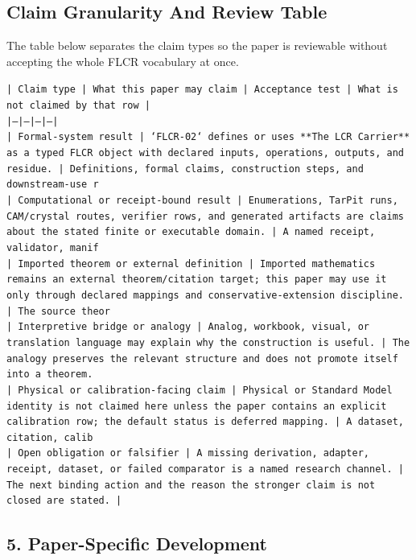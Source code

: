 \documentclass[11pt]{article}
\begin{document}
\subsection*{Claim Granularity And Review Table}

The table below separates the claim types so the paper is reviewable without accepting the whole FLCR vocabulary at once.

\noindent\texttt{| Claim type | What this paper may claim | Acceptance test | What is not claimed by that row |}\\
\noindent\texttt{|---|---|---|---|}\\
\noindent\texttt{| Formal-system result | `FLCR-02` defines or uses **The LCR Carrier** as a typed FLCR object with declared inputs, operations, outputs, and residue. | Definitions, formal claims, construction steps, and downstream-use r}\\
\noindent\texttt{| Computational or receipt-bound result | Enumerations, TarPit runs, CAM/crystal routes, verifier rows, and generated artifacts are claims about the stated finite or executable domain. | A named receipt, validator, manif}\\
\noindent\texttt{| Imported theorem or external definition | Imported mathematics remains an external theorem/citation target; this paper may use it only through declared mappings and conservative-extension discipline. | The source theor}\\
\noindent\texttt{| Interpretive bridge or analogy | Analog, workbook, visual, or translation language may explain why the construction is useful. | The analogy preserves the relevant structure and does not promote itself into a theorem. }\\
\noindent\texttt{| Physical or calibration-facing claim | Physical or Standard Model identity is not claimed here unless the paper contains an explicit calibration row; the default status is deferred mapping. | A dataset, citation, calib}\\
\noindent\texttt{| Open obligation or falsifier | A missing derivation, adapter, receipt, dataset, or failed comparator is a named research channel. | The next binding action and the reason the stronger claim is not closed are stated. | }\\

\subsection*{5. Paper-Specific Development}
\end{document}
